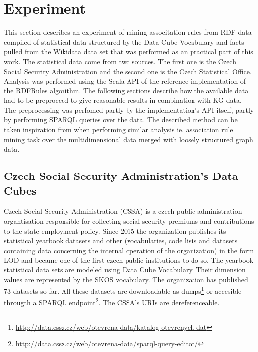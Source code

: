 \chapter{Experiment\label{experiment}}


This section describes an experiment of mining associtation rules from RDF data compiled of statistical data structured by the Data Cube Vocabulary and facts pulled from the Wikidata data set that was performed as an practical part of this work. The statistical data come from two sources. The first one is the Czech Social Security Administration and the second one is the Czech Statistical Office. Analysis was performed using the Scala API of the reference implementation of the RDFRules algorithm. The following sections describe how the available data had to be preprocced to give reasonable results in combination with KG data. The preprocessing was perfomed partly by the implementation's API itself, partly by performing SPARQL queries over the data. The described method can be taken inspiration from when performing similar analysis ie. association rule mining task over the multidimensional data merged with loosely structured graph data. 

\section{Czech Social Security Administration's Data Cubes\label{cssa}}

Czech Social Security Administration (CSSA) is a czech public administration organtisation responsible for collecting social security premiums and contributions to the state employment policy. Since 2015 the organization publishes its statistical yearbook datasets and other (vocabularies, code lists and datasets containing data concerning the internal operation of the organization) in the form LOD and became one of the first czech public institutions to do so. The yearbook statistical data sets are modeled using Data Cube Vocabulary. Their dimension values are represented by the SKOS vocabulary. The organization has published 73 datasets so far. All these datasets are downloadable as dumps\footnote{\href{http://data.cssz.cz/web/otevrena-data/katalog-otevrenych-dat}{http://data.cssz.cz/web/otevrena-data/katalog-otevrenych-dat}} or accesible througth a SPARQL endpoint\footnote{\href{http://data.cssz.cz/web/otevrena-data/sparql-query-editor/}{http://data.cssz.cz/web/otevrena-data/sparql-query-editor/}}. The CSSA's URIs are dereferenceable.

